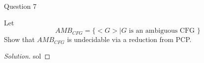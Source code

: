 \begin{solution}{Question 7}\label{ques:7}
    \begin{question}
        Let
        $$AMB_{CFG} = \{ <G> | G \text{ is an ambiguous CFG } \}$$
        Show that $AMB_{CFG}$ is undecidable via a reduction from PCP.
    \end{question}
    \tcblower{}
    \begin{proof}[Solution]
        sol
    \end{proof}
\end{solution}
